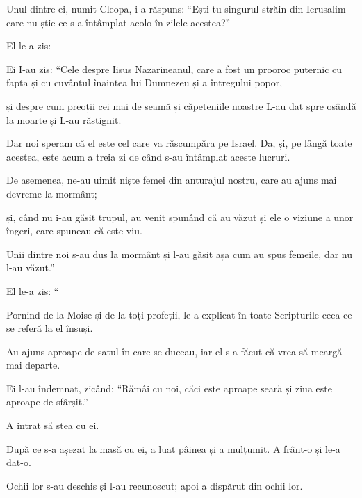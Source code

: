 {\par }{\PP {}Unul dintre ei, numit Cleopa, i-a răspuns: “Ești tu singurul străin din Ierusalim care nu știe ce s-a întâmplat acolo în zilele acestea?”


\par }{\PP {}El le-a zis:
{}

\par }{\PP Ei I-au zis: “Cele despre Iisus Nazarineanul, care a fost un prooroc puternic cu fapta și cu cuvântul înaintea lui Dumnezeu și a întregului popor,

și despre cum preoții cei mai de seamă și căpeteniile noastre L-au dat spre osândă la moarte și L-au răstignit.

Dar noi speram că el este cel care va răscumpăra pe Israel. Da, și, pe lângă toate acestea, este acum a treia zi de când s-au întâmplat aceste lucruri.

De asemenea, ne-au uimit niște femei din anturajul nostru, care au ajuns mai devreme la mormânt;

și, când nu i-au găsit trupul, au venit spunând că au văzut și ele o viziune a unor îngeri, care spuneau că este viu.

Unii dintre noi s-au dus la mormânt și l-au găsit așa cum au spus femeile, dar nu l-au văzut.”


\par }{\PP {}El le-a zis: “{}


Pornind de la Moise și de la toți profeții, le-a explicat în toate Scripturile ceea ce se referă la el însuși.


\par }{\PP {}Au ajuns aproape de satul în care se duceau, iar el s-a făcut că vrea să meargă mai departe.


\par }{\PP {}Ei l-au îndemnat, zicând: “Rămâi cu noi, căci este aproape seară și ziua este aproape de sfârșit.”

\par }{\PP A intrat să stea cu ei.

După ce s-a așezat la masă cu ei, a luat pâinea și a mulțumit. A frânt-o și le-a dat-o.

Ochii lor s-au deschis și l-au recunoscut; apoi a dispărut din ochii lor.

}
